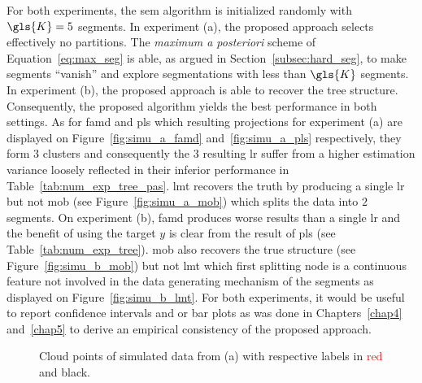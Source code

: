 For both experiments, the \gls{sem} algorithm is initialized randomly with $\gls{K} = 5$ segments. In experiment (a), the proposed approach selects effectively no partitions. The \textit{maximum a posteriori} scheme of Equation~\eqref{eq:max_seg} is able, as argued in Section~\ref{subsec:hard_seg}, to make segments ``vanish'' and explore segmentations with less than $\gls{K}$ segments. In experiment (b), the proposed approach is able to recover the tree structure. Consequently, the proposed algorithm yields the best performance in both settings. As for \gls{famd} and \gls{pls} which resulting projections for experiment (a) are displayed on Figure~\ref{fig:simu_a_famd} and~\ref{fig:simu_a_pls} respectively, they form $3$ clusters and consequently the $3$ resulting \gls{lr} suffer from a higher estimation variance loosely reflected in their inferior performance in Table~\ref{tab:num_exp_tree_pas}. \gls{lmt} recovers the truth by producing a single \gls{lr} but not \gls{mob} (see Figure~\ref{fig:simu_a_mob}) which splits the data into $2$ segments. On experiment (b), \gls{famd} produces worse results than a single \gls{lr} and the benefit of using the target $y$ is clear from the result of \gls{pls} (see Table~\ref{tab:num_exp_tree}). \gls{mob} also recovers the true structure (see Figure~\ref{fig:simu_b_mob}) but not \gls{lmt} which first splitting node is a continuous feature not involved in the data generating mechanism of the segments as displayed on Figure~\ref{fig:simu_b_lmt}. For both experiments, it would be useful to report confidence intervals and or bar plots as was done in Chapters~\ref{chap4} and~\ref{chap5} to derive an empirical consistency of the proposed approach.

\begin{figure}
\centering \resizebox{.7\textwidth}{!}{}
\caption{Cloud points of simulated data from (a) with respective labels in \textcolor{red}{red} and black.}
\label{fig:simu_pas}
\end{figure}


